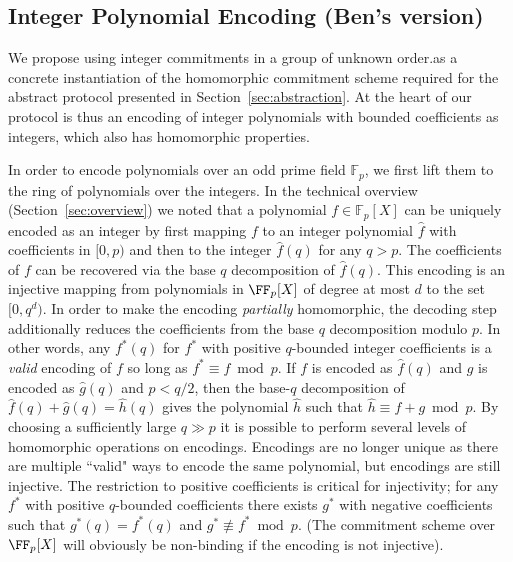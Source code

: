 \subsection{Integer Polynomial Encoding (Ben's version)}
\label{sec:encoding}
We propose using integer commitments in a group of unknown order.as a concrete instantiation of the homomorphic commitment scheme required for the abstract protocol presented in Section~\ref{sec:abstraction}. At the heart of our protocol is thus an encoding of integer polynomials with bounded coefficients as integers, which also has homomorphic properties. 

In order to encode polynomials over an odd prime field $\mathbb{F}_p$, we first lift them to the ring of polynomials over the integers. In the technical overview (Section~\ref{sec:overview}) we noted that a polynomial $f \in \mathbb{F}_p[X]$ can be uniquely encoded as an integer by first mapping $f$ to an integer polynomial $\hat{f}$ with coefficients in $[0, p)$ and then to the integer $\hat{f}(q)$ for any $q > p$. 
The coefficients of $f$ can be recovered via the base $q$ decomposition of $\hat{f}(q)$. 
This encoding is an injective mapping from polynomials in $\FF_p[X]$ of degree at most $d$ to the set $[0, q^d)$. In order to make the encoding \emph{partially} homomorphic, the decoding step additionally reduces the coefficients from the base $q$ decomposition modulo $p$. In other words, any $f^*(q)$ for $f^*$ with positive $q$-bounded integer coefficients is a \emph{valid} encoding of $f$ so long as $f^* \equiv f \bmod p$. If $f$ is encoded as $\hat{f}(q)$ and $g$ is encoded as $\hat{g}(q)$ and $p < q/2$, then the base-$q$ decomposition of $\hat{f}(q) + \hat{g}(q) = \hat{h}(q)$ gives the polynomial $\hat{h}$ such that $\hat{h} \equiv f + g \bmod p$. By choosing a sufficiently large $q \gg p$ it is possible to perform several levels of homomorphic operations on encodings. Encodings are no longer unique as there are multiple ``valid" ways to encode the same polynomial, but encodings are still injective. The restriction to positive coefficients is critical for injectivity; for any $f^*$ with positive $q$-bounded coefficients there exists $g^*$ with negative coefficients such that $g^*(q) = f^*(q)$ and $g^* \not \equiv f^* \bmod p$. (The commitment scheme over $\FF_p[X]$ will obviously be non-binding if the encoding is not injective). 

